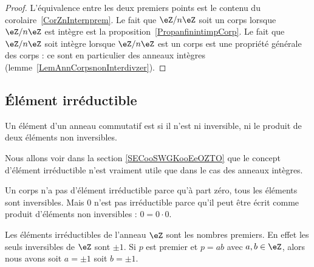 \begin{proof}
	L'équivalence entre les deux premiers points est le contenu du corolaire~\ref{CorZnInternprem}. Le fait que \( \eZ/n\eZ\) soit un corps lorsque \( \eZ/n\eZ\) est intègre est la proposition~\ref{PropanfinintimpCorp}. Le fait que \( \eZ/n\eZ\) soit intègre lorsque \( \eZ/n\eZ\) est un corps est une propriété générale des corps : ce sont en particulier des anneaux intègres (lemme~\ref{LemAnnCorpsnonInterdivzer}).
\end{proof}

\subsection{Élément irréductible}

\begin{definition}  \label{DeirredBDhQfA}
	Un élément d'un anneau commutatif est  si il n'est ni inversible, ni le produit de deux éléments non inversibles.
\end{definition}

\begin{normaltext}
	Nous allons voir dans la section \ref{SECooSWGKooEeOZTO} que le concept d'élément irréductible n'est vraiment utile que dans le cas des anneaux intègres.
\end{normaltext}

\begin{example}
	Un corps n'a pas d'élément irréductible parce qu'à part zéro, tous les éléments sont inversibles. Mais \( 0\) n'est pas irréductible parce qu'il peut être écrit comme produit d'éléments non inversibles : \( 0=0\cdot 0\).
\end{example}

\begin{example}
	Les éléments irréductibles de l'anneau \( \eZ\) sont les nombres premiers. En effet les seuls inversibles de \( \eZ\) sont \( \pm 1\). Si \( p\) est premier et \( p=ab\) avec \( a,b\in \eZ\), alors nous avons soit \( a=\pm 1\) soit \( b=\pm 1\).
\end{example}

